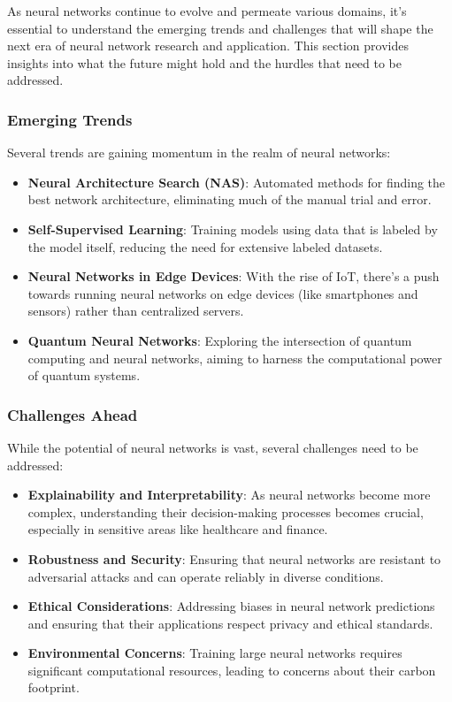 As neural networks continue to evolve and permeate various domains, it's essential to understand the emerging trends and challenges that will shape the next era of neural network research and application. This section provides insights into what the future might hold and the hurdles that need to be addressed.

\subsubsection{Emerging Trends}

Several trends are gaining momentum in the realm of neural networks:

\begin{itemize}
    \item \textbf{Neural Architecture Search (NAS)}: Automated methods for finding the best network architecture, eliminating much of the manual trial and error.
    \item \textbf{Self-Supervised Learning}: Training models using data that is labeled by the model itself, reducing the need for extensive labeled datasets.
    \item \textbf{Neural Networks in Edge Devices}: With the rise of IoT, there's a push towards running neural networks on edge devices (like smartphones and sensors) rather than centralized servers.
    \item \textbf{Quantum Neural Networks}: Exploring the intersection of quantum computing and neural networks, aiming to harness the computational power of quantum systems.
\end{itemize}

\subsubsection{Challenges Ahead}

While the potential of neural networks is vast, several challenges need to be addressed:

\begin{itemize}
    \item \textbf{Explainability and Interpretability}: As neural networks become more complex, understanding their decision-making processes becomes crucial, especially in sensitive areas like healthcare and finance.
    \item \textbf{Robustness and Security}: Ensuring that neural networks are resistant to adversarial attacks and can operate reliably in diverse conditions.
    \item \textbf{Ethical Considerations}: Addressing biases in neural network predictions and ensuring that their applications respect privacy and ethical standards.
    \item \textbf{Environmental Concerns}: Training large neural networks requires significant computational resources, leading to concerns about their carbon footprint.
\end{itemize}

